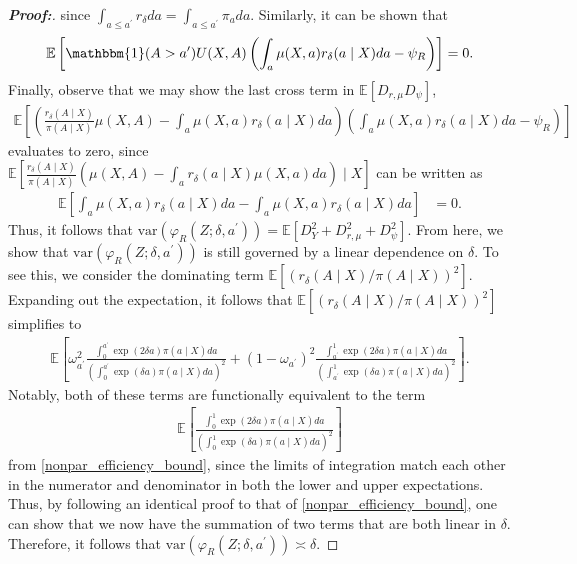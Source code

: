 \documentclass[11pt,twoside]{article}
\newcommand{\var}{\text{var}}
\theoremstyle{definition}
\theoremstyle{remark}
\begin{document}
\begin{proof}[\textbf{Proof:}]
since $\int_{a \leq a^{\prime}}  r_\delta da  = \int_{a \leq a^{\prime}} \pi_a da$. Similarly, it can be shown that
\begin{align*}
     \mathbb{E}\left[ \mathbbm{1}(A > a^{\prime})U(X, A)\left(\int_a \mu(X, a) r_\delta(a \mid X) da  - \psi_R \right) \right] = 0.
\end{align*}
Finally, observe that we may show the last cross term in $\mathbb{E}[D_{r,\mu} D_\psi]$,
\begin{align*}
    \mathbb{E}\left[\left(  \frac{r_\delta(A \mid X)}{\pi(A \mid X)} \mu(X, A) -  \int_a \mu(X, a) r_\delta(a \mid X) da\right)\left(\int_a \mu(X, a) r_\delta(a \mid X) da  - \psi_R \right) \right]
\end{align*}
evaluates to zero, since $ \mathbb{E}\left[\frac{r_\delta(A \mid X)}{\pi(A \mid X)}\left( \mu(X, A) - \int_a r_\delta(a \mid X) \mu(X, a)da \right) \mid X \right]$ can be written as 
\begin{align*}
   \mathbb{E}\left[ \int_a \mu(X, a) r_\delta(a \mid X) da - \int_a  \mu(X, a) r_\delta(a \mid X) da \right]  &= 0.
\end{align*}
Thus, it follows that $\var(\varphi_R(Z;\delta, a^\prime)) = \mathbb{E}[D^2_Y + D^2_{r, \mu} + D^2_\psi]$. From here, we show that $\var(\varphi_R(Z;\delta, a^\prime))$ is still governed by a linear dependence on $\delta$. To see this, we consider the dominating term $ \mathbb{E}\left[\left(r_\delta(A \mid X) / \pi(A \mid X) \right)^2 \right]$. Expanding out the expectation, it follows that $\mathbb{E}\left[\left(r_\delta(A \mid X) / \pi(A \mid X) \right)^2 \right]$ simplifies to
\begin{align*}
 \mathbb{E}\left[\omega^2_{a^\prime}\frac{\int^{a^\prime}_0 \exp(2 \delta a) \pi(a \mid X) da}{\left(\int^{a^\prime}_0 \exp(\delta a) \pi(a \mid X) da \right)^2} + (1-\omega_{a^\prime})^2\frac{\int^{1}_{a^\prime} \exp(2 \delta a) \pi(a \mid X) da}{\left(\int^{1}_{a^\prime} \exp(\delta a) \pi(a \mid X) da \right)^2} \right].
\end{align*}
Notably, both of these terms are functionally equivalent to the term
\begin{align*}
    \mathbb{E}\left[\frac{\int^1_0 \exp(2 \delta a) \pi(a \mid X) da}{\left(\int^1_0 \exp(\delta a) \pi(a \mid X) da \right)^2} \right]
\end{align*}
from \cref{nonpar_efficiency_bound}, since the limits of integration match each other in the numerator and denominator in both the lower and upper expectations. Thus, by following an identical proof to that of \cref{nonpar_efficiency_bound}, one can show that we now have the summation of two terms that are both linear in $\delta$. Therefore, it follows that $\var(\varphi_R(Z;\delta, a^\prime)) \asymp \delta$.

\end{proof}
\end{document}
